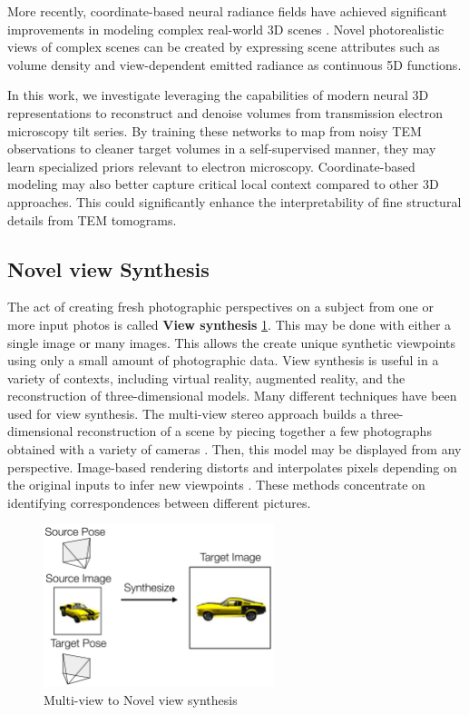 More recently, coordinate-based neural radiance fields have achieved significant improvements in modeling complex real-world 3D scenes \cite{Mildenhall2020}. Novel photorealistic views of complex scenes can be created by expressing scene attributes such as volume density and view-dependent emitted radiance as continuous 5D functions.

\vspace{10pt}

In this work, we investigate leveraging the capabilities of modern neural 3D representations to reconstruct and denoise volumes from transmission electron microscopy tilt series. By training these networks to map from noisy TEM observations to cleaner target volumes in a self-supervised manner, they may learn specialized priors relevant to electron microscopy. Coordinate-based modeling may also better capture critical local context compared to other 3D approaches. This could significantly enhance the interpretability of fine structural details from TEM tomograms.


\subsection{Novel view Synthesis}
The act of creating fresh photographic perspectives on a subject from one or more input photos is called \textbf{View synthesis}  \ref{fig:Multi-view to Novel view synthesis}. This may be done with either a single image or many images. This allows the create unique synthetic viewpoints using only a small amount of photographic data. View synthesis is useful in a variety of contexts, including virtual reality, augmented reality, and the reconstruction of three-dimensional models\cite{Xia}.
Many different techniques have been used for view synthesis. The multi-view stereo approach builds a three-dimensional reconstruction of a scene by piecing together a few photographs obtained with a variety of cameras \cite{Seitz2006}\cite{Xia}. Then, this model may be displayed from any perspective.     Image-based rendering distorts and interpolates pixels depending on the original inputs to infer new viewpoints \cite{Chen2023}. These methods concentrate on identifying correspondences between different pictures.
\vspace{10pt}
\begin{figure}[thbp]
    \centering
    \includegraphics[width=0.6\textwidth]{img/novel view}
    \caption{Multi-view to Novel view synthesis\cite{Hartley2000}}\label{fig:Multi-view to Novel view synthesis}
\end{figure}

